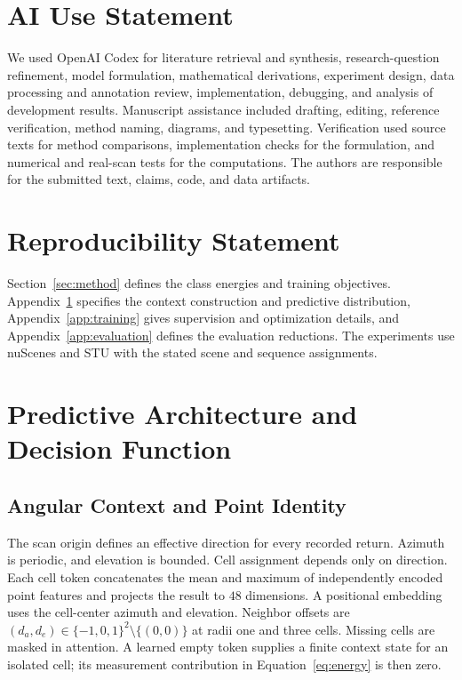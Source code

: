 \documentclass{article}
\begin{document}
\FloatBarrier
\section*{AI Use Statement}
We used OpenAI Codex for literature retrieval and synthesis, research-question refinement, model formulation, mathematical derivations, experiment design, data processing and annotation review, implementation, debugging, and analysis of development results. Manuscript assistance included drafting, editing, reference verification, method naming, diagrams, and typesetting. Verification used source texts for method comparisons, implementation checks for the formulation, and numerical and real-scan tests for the computations. The authors are responsible for the submitted text, claims, code, and data artifacts.

\section*{Reproducibility Statement}
Section~\ref{sec:method} defines the class energies and training objectives. Appendix~\ref{app:architecture} specifies the context construction and predictive distribution, Appendix~\ref{app:training} gives supervision and optimization details, and Appendix~\ref{app:evaluation} defines the evaluation reductions. The experiments use nuScenes and STU with the stated scene and sequence assignments.




\clearpage
\appendix
\section{Predictive Architecture and Decision Function}
\label{app:architecture}
\subsection{Angular Context and Point Identity}
The scan origin defines an effective direction for every recorded return. Azimuth is periodic, and elevation is bounded. Cell assignment depends only on direction. Each cell token concatenates the mean and maximum of independently encoded point features and projects the result to $48$ dimensions. A positional embedding uses the cell-center azimuth and elevation. Neighbor offsets are $(d_a,d_e)\in\{-1,0,1\}^2\setminus\{(0,0)\}$ at radii one and three cells. Missing cells are masked in attention. A learned empty token supplies a finite context state for an isolated cell; its measurement contribution in Equation~\eqref{eq:energy} is then zero.
\end{document}
